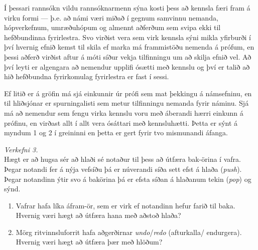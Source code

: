 \documentclass[a4paper, 12pt]{article}
\begin{document}
\begin{description}[leftmargin=!,labelwidth=\widthof{\bfseries Example:},labelindent=0em]
  \item[Úrlausn]
  Í þessari rannsókn vildu rannsóknarmenn sýna kosti þess að kennsla færi fram á virku formi — þ.e. að námi væri miðað í gegnum samvinnu nemanda, hópverkefnum, umræðuhópum og almennt aðferðum sem svipa ekki til hefðbundinna fyrirlestra. 
  Svo virðist vera sem virk kennsla sýni mikla yfirburði í því hvernig efnið kemst til skila ef marka má frammistöðu nemenda á prófum, en þessi aðferð virðist aftur á móti síður vekja tilfinningu um að skilja efnið vel. 
  Að því leyti er algengara að nemendur upplifi ósætti með kennslu og því er talið að hið hefðbundna fyrirkomulag fyrirlestra er fast í sessi.

  \medskip
  Ef litið er á gröfin má sjá einkunnir úr prófi sem mat þekkingu á námsefninu, en til hliðsjónar er spurningalisti sem metur tilfinningu nemanda fyrir náminu. 
  Sjá má að nemendur sem fengu virka kennslu voru með áberandi hærri einkunn á prófinu, en virðast allt í allt vera ósáttari með kennsluhætti. 
  Þetta er sýnt á myndum 1 og 2 í greininni en þetta er gert fyrir tvo mismunandi áfanga.
\end{description}

\newpage
\noindent
\emph{Verkefni 3.} \\
Hægt er að hugsa sér að hlaði sé notaður til þess að útfæra bak-örina í vafra.  
Þegar notandi fer á nýja vefsíðu þá er núverandi síða sett efst á hlaða (\emph{push}). 
Þegar notandinn ýtir svo á bakörina þá er efsta síðan á hlaðanum tekin (\emph{pop}) og sýnd.

\begin{enumerate}[label=(\alph*)]
  \item Vafrar hafa líka áfram-ör, sem er virk ef notandinn hefur farið til baka.  Hvernig 
  væri hægt að útfæra hana með aðstoð hlaða?
  \item Mörg ritvinnsluforrit hafa aðgerðirnar \emph{undo}/\emph{redo} (afturkalla/ endurgera).  Hvernig 
  væri hægt að útfæra þær með hlöðum? 
\end{enumerate}
\end{document}
